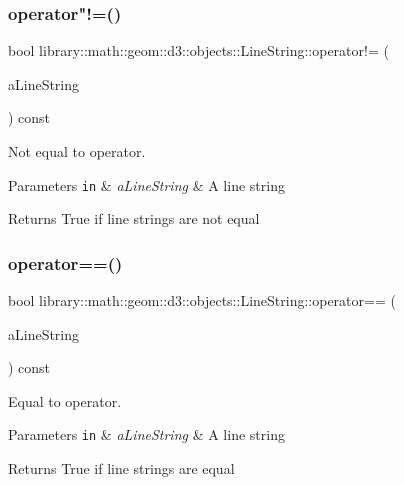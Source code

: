 \subsubsection{\texorpdfstring{operator"!=()}{operator!=()}}
{\footnotesize\ttfamily bool library\+::math\+::geom\+::d3\+::objects\+::\+Line\+String\+::operator!= (\begin{DoxyParamCaption}\item[{const \hyperlink{classlibrary_1_1math_1_1geom_1_1d3_1_1objects_1_1_line_string}{Line\+String} \&}]{a\+Line\+String }\end{DoxyParamCaption}) const}



Not equal to operator. 


\begin{DoxyParams}[1]{Parameters}
\mbox{\tt in}  & {\em a\+Line\+String} & A line string \\
\hline
\end{DoxyParams}
\begin{DoxyReturn}{Returns}
True if line strings are not equal 
\end{DoxyReturn}
\mbox{\label{classlibrary_1_1math_1_1geom_1_1d3_1_1objects_1_1_line_string_ab413b3ed8f6f78697420f6c4c3b4d0e6}} 
\subsubsection{\texorpdfstring{operator==()}{operator==()}}
{\footnotesize\ttfamily bool library\+::math\+::geom\+::d3\+::objects\+::\+Line\+String\+::operator== (\begin{DoxyParamCaption}\item[{const \hyperlink{classlibrary_1_1math_1_1geom_1_1d3_1_1objects_1_1_line_string}{Line\+String} \&}]{a\+Line\+String }\end{DoxyParamCaption}) const}



Equal to operator. 


\begin{DoxyParams}[1]{Parameters}
\mbox{\tt in}  & {\em a\+Line\+String} & A line string \\
\hline
\end{DoxyParams}
\begin{DoxyReturn}{Returns}
True if line strings are equal 
\end{DoxyReturn}
\mbox{\label{classlibrary_1_1math_1_1geom_1_1d3_1_1objects_1_1_line_string_a289414dbfc4ff32520f546c8a435170f}} 
